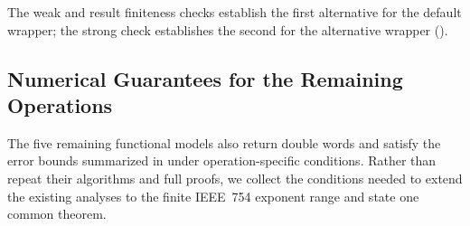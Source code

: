The weak and result finiteness checks establish the first alternative
for the default wrapper; the strong check establishes the second for
the alternative wrapper ().

\subsection{Numerical Guarantees for the Remaining Operations}
\label{sec:remaining-numerical-conditions}

The five remaining functional models also return double words and satisfy the
error bounds summarized in  under
operation-specific conditions. Rather than repeat their algorithms and full
proofs, we collect the conditions needed to extend the existing analyses to
the finite IEEE~754 exponent range and state one common theorem.

